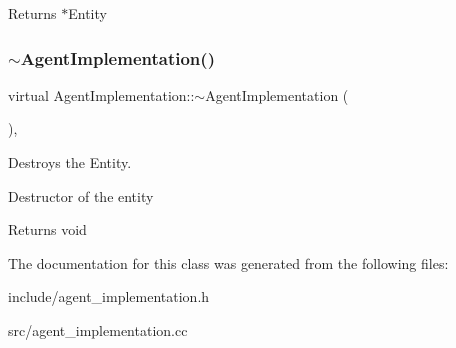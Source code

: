 \begin{DoxyReturn}{Returns}
$\ast$\+Entity 
\end{DoxyReturn}
\mbox{\label{class_agent_implementation_ae383896c0ef652632ca1967fb8490c8d}} 
\subsubsection{\texorpdfstring{$\sim$\+Agent\+Implementation()}{~AgentImplementation()}}
{\footnotesize\ttfamily virtual Agent\+Implementation\+::$\sim$\+Agent\+Implementation (\begin{DoxyParamCaption}{ }\end{DoxyParamCaption})\hspace{0.3cm}{\ttfamily [inline]}, {}}



Destroys the Entity. 

Destructor of the entity

\begin{DoxyReturn}{Returns}
void 
\end{DoxyReturn}


The documentation for this class was generated from the following files\+:\begin{DoxyCompactItemize}
\item 
include/agent\+\_\+implementation.\+h\item 
src/agent\+\_\+implementation.\+cc\end{DoxyCompactItemize}
